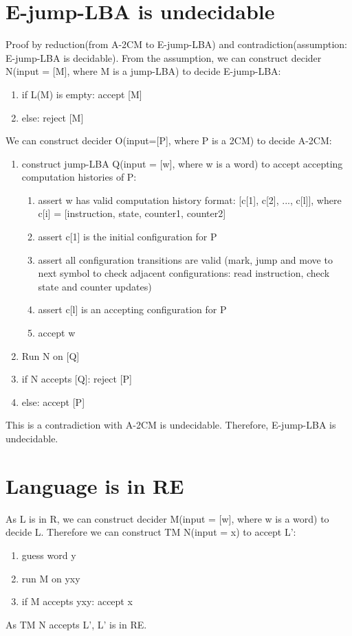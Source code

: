 \documentclass{article}
\begin{document}
\section{E-jump-LBA is undecidable}
Proof by reduction(from A-2CM to E-jump-LBA) and contradiction(assumption: E-jump-LBA is decidable). From the assumption, we can construct decider N(input = [M], where M is a jump-LBA) to decide E-jump-LBA:
\begin{enumerate}
	\item if L(M) is empty: accept [M]
	\item else: reject [M]
\end{enumerate}
We can construct decider O(input=[P], where P is a 2CM) to decide A-2CM:
\begin{enumerate}
	\item construct jump-LBA Q(input = [w], where w is a word) to accept accepting computation histories of P:
	\begin{enumerate}
		\item assert w has valid computation history format: [c[1], c[2], ..., c[l]], where c[i] = [instruction, state, counter1, counter2]
		\item assert c[1] is the initial configuration for P
		\item assert all configuration transitions are valid (mark, jump and move to next symbol to check adjacent configurations: read instruction, check state and counter updates)
		\item assert c[l] is an accepting configuration for P
		\item accept w
	\end{enumerate}
	\item Run N on [Q]
	\item if N accepts [Q]: reject [P]
	\item else: accept [P]
\end{enumerate}
This is a contradiction with A-2CM is undecidable. Therefore, E-jump-LBA is undecidable.

\section{Language is in RE}
As L is in R, we can construct decider M(input = [w], where w is a word) to decide L. Therefore we can construct TM N(input = x) to accept L':
\begin{enumerate}
	\item guess word y
	\item run M on yxy
	\item if M accepts yxy: accept x
\end{enumerate}
As TM N accepts L', L' is in RE.
\end{document}
